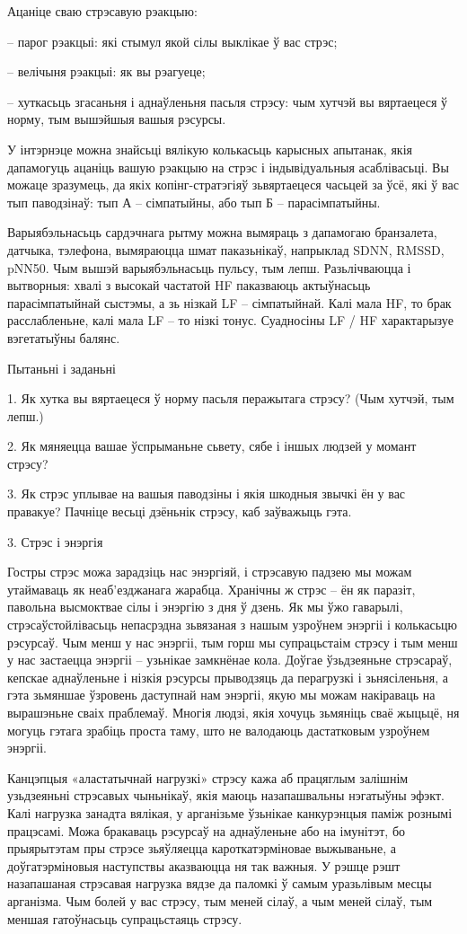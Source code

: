 Ацаніце сваю стрэсавую рэакцыю:

– парог рэакцыі: які стымул якой сілы выклікае ў вас стрэс;

– велічыня рэакцыі: як вы рэагуеце;

– хуткасьць згасаньня і аднаўленьня пасьля стрэсу: чым хутчэй вы вяртаецеся ў норму, тым вышэйшыя вашыя рэсурсы.

У інтэрнэце можна знайсьці вялікую колькасьць карысных апытанак, якія дапамогуць ацаніць вашую рэакцыю на стрэс і індывідуальныя асаблівасьці. Вы можаце зразумець, да якіх копінг-стратэгіяў зьвяртаецеся часьцей за ўсё, які ў вас тып паводзінаў: тып А – сімпатыйны, або тып Б – парасімпатыйны.

Варыябэльнасьць сардэчнага рытму можна вымяраць з дапамогаю бранзалета, датчыка, тэлефона, вымяраюцца шмат паказьнікаў, напрыклад SDNN, RMSSD, pNN50. Чым вышэй варыябэльнасьць пульсу, тым лепш. Разьлічваюцца і вытворныя: хвалі з высокай частатой HF паказваюць актыўнасьць парасімпатыйнай сыстэмы, а зь нізкай LF – сімпатыйнай. Калі мала HF, то брак расслабленьне, калі мала LF – то нізкі тонус. Суадносіны LF / HF характарызуе вэгетатыўны балянс.

Пытаньні і заданьні

1. Як хутка вы вяртаецеся ў норму пасьля перажытага стрэсу? (Чым хутчэй, тым лепш.)

2. Як мяняецца вашае ўспрыманьне сьвету, сябе і іншых людзей у момант стрэсу?

3. Як стрэс уплывае на вашыя паводзіны і якія шкодныя звычкі ён у вас правакуе? Пачніце весьці дзёньнік стрэсу, каб заўважыць гэта.


3. Стрэс і энэргія

Гостры стрэс можа зарадзіць нас энэргіяй, і стрэсавую падзею мы можам утаймаваць як неаб'езджанага жарабца. Хранічны ж стрэс – ён як паразіт, павольна высмоктвае сілы і энэргію з дня ў дзень. Як мы ўжо гаварылі, стрэсаўстойлівасьць непасрэдна зьвязаная з нашым узроўнем энэргіі і колькасьцю рэсурсаў. Чым менш у нас энэргіі, тым горш мы супрацьстаім стрэсу і тым менш у нас застаецца энэргіі – узьнікае замкнёнае кола. Доўгае ўзьдзеяньне стрэсараў, кепскае аднаўленьне і нізкія рэсурсы прыводзяць да перагрузкі і зьнясіленьня, а гэта зьмяншае ўзровень даступнай нам энэргіі, якую мы можам накіраваць на вырашэньне сваіх праблемаў. Многія людзі, якія хочуць зьмяніць сваё жыцьцё, ня могуць гэтага зрабіць проста таму, што не валодаюць дастатковым узроўнем энэргіі.

Канцэпцыя «аластатычнай нагрузкі» стрэсу кажа аб працяглым залішнім узьдзеяньні стрэсавых чыньнікаў, якія маюць назапашвальны нэгатыўны эфэкт. Калі нагрузка занадта вялікая, у арганізьме ўзьнікае канкурэнцыя паміж рознымі працэсамі. Можа бракаваць рэсурсаў на аднаўленьне або на імунітэт, бо прыярытэтам пры стрэсе зьяўляецца кароткатэрміновае выжываньне, а доўгатэрміновыя наступствы аказваюцца ня так важныя. У рэшце рэшт назапашаная стрэсавая нагрузка вядзе да паломкі ў самым уразьлівым месцы арганізма. Чым болей у вас стрэсу, тым меней сілаў, а чым меней сілаў, тым меншая гатоўнасьць супрацьстаяць стрэсу.

